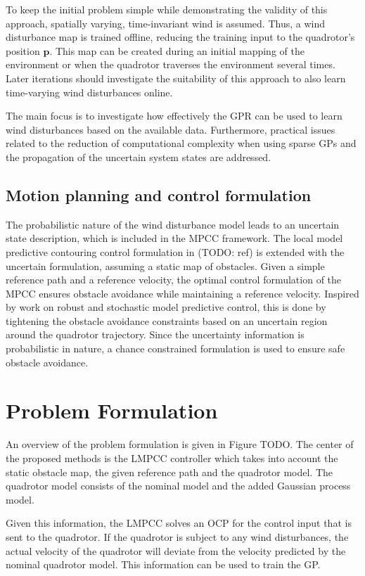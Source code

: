 To keep the initial problem simple while demonstrating the validity of this approach, spatially varying, time-invariant wind is assumed. Thus, a wind disturbance map is trained offline, reducing the training input to the quadrotor's position $\mathbf{p}$. This map can be created during an initial mapping of the environment or when the quadrotor traverses the environment several times. Later iterations should investigate the suitability of this approach to also learn time-varying wind disturbances online. 

The main focus is to investigate how effectively the GPR can be used to learn wind disturbances based on the available data. Furthermore, practical issues related to the reduction of computational complexity when using sparse GPs and the propagation of the uncertain system states are addressed.

\subsection{Motion planning and control formulation}

The probabilistic nature of the wind disturbance model leads to an uncertain state description, which is included in the MPCC framework. The local model predictive contouring control formulation in (TODO: ref) is extended with the uncertain formulation, assuming a static map of obstacles. 
Given a simple reference path and a reference velocity, the optimal control formulation of the MPCC ensures obstacle avoidance while maintaining a reference velocity. Inspired by work on robust and stochastic model predictive control, this is done by tightening the obstacle avoidance constraints based on an uncertain region around the quadrotor trajectory. Since the uncertainty information is probabilistic in nature, a chance constrained formulation is used to ensure safe obstacle avoidance. 

\section{Problem Formulation}

An overview of the problem formulation is given in Figure TODO. The center of the proposed methods is the LMPCC controller which takes into account the static obstacle map, the given reference path and the quadrotor model. The quadrotor model consists of the nominal model and the added Gaussian process model. 

Given this information, the LMPCC solves an OCP for the control input that is sent to the quadrotor. If the quadrotor is subject to any wind disturbances, the actual velocity of the quadrotor will deviate from the velocity predicted by the nominal quadrotor model. This information can be used to train the GP. 

